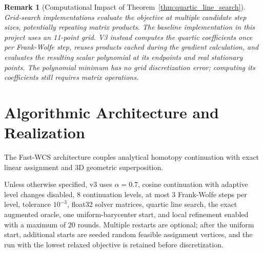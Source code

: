 \documentclass[conference]{IEEEtran}
\newtheorem{remark}{Remark}
\begin{document}
\begin{remark}[Computational Impact of Theorem~\ref{thm:quartic_line_search}]
Grid-search implementations evaluate the objective at multiple candidate step sizes, potentially repeating matrix products. The baseline implementation in this project uses an 11-point grid. V3 instead computes the quartic coefficients once per Frank-Wolfe step, reuses products cached during the gradient calculation, and evaluates the resulting scalar polynomial at its endpoints and real stationary points. The polynomial minimum has no grid discretization error; computing its coefficients still requires matrix operations.
\end{remark}


\section{Algorithmic Architecture and Realization}
\label{sec:algorithms}

The Fast-WCS architecture couples analytical homotopy continuation with exact linear assignment and 3D geometric superposition.

Unless otherwise specified, v3 uses $\alpha=0.7$, cosine continuation with adaptive level changes disabled, $8$ continuation levels, at most $3$ Frank-Wolfe steps per level, tolerance $10^{-3}$, float32 solver matrices, quartic line search, the exact augmented oracle, one uniform-barycenter start, and local refinement enabled with a maximum of $20$ rounds. Multiple restarts are optional; after the uniform start, additional starts are seeded random feasible assignment vertices, and the run with the lowest relaxed objective is retained before discretization.
\end{document}
